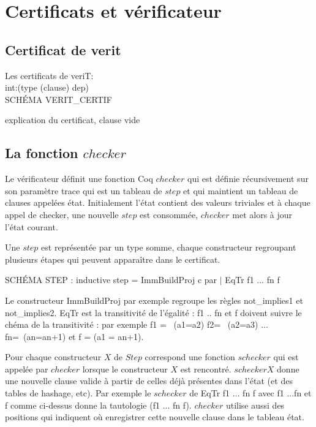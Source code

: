 \documentclass{article}
\begin{document}
\newpage
\section{Certificats et vérificateur}

\subsection{Certificat de verit}

Les certificats de veriT:\\
int:(type (clause) dep) \\

SCHÉMA VERIT\_CERTIF

explication du certificat, clause vide

\subsection{La fonction $checker$}

Le vérificateur définit une fonction Coq $checker$ qui est définie récursivement sur son paramètre trace qui est un tableau de $step$ et qui maintient un tableau de clauses appelées état. Initialement l'état contient des valeurs triviales et à chaque appel de checker, une nouvelle $step$ est consommée, $checker$ met alors à jour l'état courant.

Une $step$ est représentée par un type somme, chaque constructeur regroupant plusieurs étapes qui peuvent apparaître dans le certificat.

SCHÉMA STEP : inductive step = ImmBuildProj c par $|$ EqTr f1 ... fn f

Le constructeur ImmBuildProj par exemple regroupe les règles not\_implies1 et not\_implies2. EqTr est la transitivité de l'égalité : f1 .. fn et f doivent suivre le chéma de la transitivité : par exemple f1 = ~(a1=a2) f2= ~(a2=a3) ... fn=~(an=a{n+1}) et f = (a1 = a{n+1}).

Pour chaque constructeur $X$ de $Step$ correspond une fonction $schecker$ qui est appelée par $checker$ lorsque le constructeur $X$ est rencontré. $schecker X$ donne une nouvelle clause valide à partir de celles déjà présentes dans l'état (et des tables de hashage, etc). Par exemple le $schecker$ de EqTr f1 ... fn f avec f1 ...fn et f comme ci-dessus donne la tautologie (f1 \/ ... \/ fn \/ f). $checker$ utilise aussi des positions qui indiquent où enregistrer cette nouvelle clause dans le tableau état. \\
\end{document}
